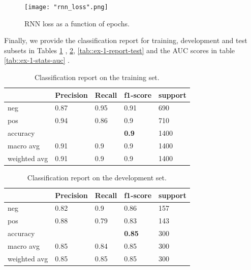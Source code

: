 \documentclass[10pt, a4paper]{article}
\begin{document}
	\begin{figure}
		\centering
		\texttt{[image: "rnn\_loss".png]}
		\caption{RNN loss as a function of epochs.}
		\label{fig::rnn_loss}
	\end{figure}
	
	
	
	Finally, we provide the classification report for training, development and test subsets in Tables \ref{tab::ex-1-report-train} , \ref{tab::ex-1-report-dev}, \ref{tab::ex-1-report-test} and the AUC scores in table \ref{tab::ex-1-stats-auc} .
	
	\begin{table}
		\begin{tabular}{|l|l|l|l|l|}
			\hline
			\cellcolor{blue!25}\textbf{} & \cellcolor{blue!25}\textbf{Precision} &
			\cellcolor{blue!25}\textbf{Recall}  &
			\cellcolor{blue!25}\textbf{f1-score}  &
			\cellcolor{blue!25}\textbf{support}\\
			\hline
			neg & 0.87 & 0.95 & 0.91 & 690 \\\hline
			pos & 0.94  & 0.86 & 0.9 & 710 \\\hline
			accuracy & & & \textbf{0.9} & 1400 \\\hline
			macro avg & 0.91 & 0.9 & 0.9 & 1400 \\\hline
			weighted avg & 0.91 & 0.9 & 0.9 & 1400 \\\hline
			
		\end{tabular}
		\centering
		\caption{Classification report on the training set.}
		\label{tab::ex-1-report-train}
	\end{table}
	
	\begin{table}
		\begin{tabular}{|l|l|l|l|l|}
			\hline
			\cellcolor{blue!25}\textbf{} & \cellcolor{blue!25}\textbf{Precision} &
			\cellcolor{blue!25}\textbf{Recall}  &
			\cellcolor{blue!25}\textbf{f1-score}  &
			\cellcolor{blue!25}\textbf{support}\\
			\hline
			neg & 0.82 & 0.9 & 0.86 & 157 \\\hline
			pos & 0.88  & 0.79 & 0.83 & 143 \\\hline
			accuracy & & & \textbf{0.85} & 300 \\\hline
			macro avg & 0.85 & 0.84 & 0.85 & 300 \\\hline
			weighted avg & 0.85 & 0.85 & 0.85 & 300 \\\hline
			
		\end{tabular}
		\centering
		\caption{Classification report on the development set.}
		\label{tab::ex-1-report-dev}
	\end{table}
	
\end{document}
